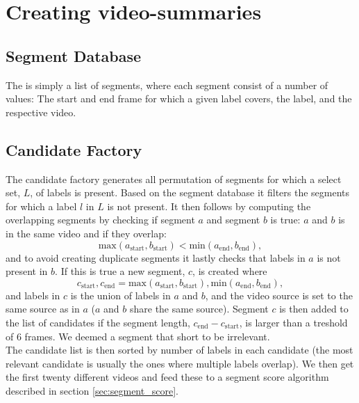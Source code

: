 %
\section{Creating video-summaries}
%

%
\subsection{Segment Database}
%
The is simply a list of segments, where each segment consist of a number of values: The start and end frame for which a given label covers, the label, and the respective video.
%
\subsection{Candidate Factory}
%
The candidate factory generates all permutation of segments for which a select set, $L$, of labels is present. Based on the segment database it filters the segments for which a label $l$ in $L$ is not present. It then follows by computing the overlapping segments by checking if segment $a$ and segment $b$ is true: $a$ and $b$ is in the same video and if they overlap:
\[
\text{max}(a_{\text{start}}, b_{\text{start}}) < \text{min}(a_{\text{end}}, b_{\text{end}}),
\] %
and to avoid creating duplicate segments it lastly checks that labels in $a$ is not present in $b$. If this is true a new segment, $c$, is created where 
\[
c_{\text{start}}, c_{\text{end}} = \text{max}(a_{\text{start}}, b_{\text{start}}), \text{min}(a_{\text{end}}, b_{\text{end}}),
\]
and labels in $c$ is the union of labels in $a$ and $b$, and the video source is set to the same source as in $a$ ($a$ and $b$ share the same source). Segment $c$ is then added to the list of candidates if the segment length, $c_{\text{end}} - c_{\text{start}}$, is larger than a treshold of 6 frames. We deemed a segment that short to be irrelevant.\\
The candidate list is then sorted by number of labels in each candidate (the most relevant candidate is usually the ones where multiple labels overlap). We then get the first twenty different videos and feed these to a segment score algorithm described in section \ref{sec:segment_score}.
%
